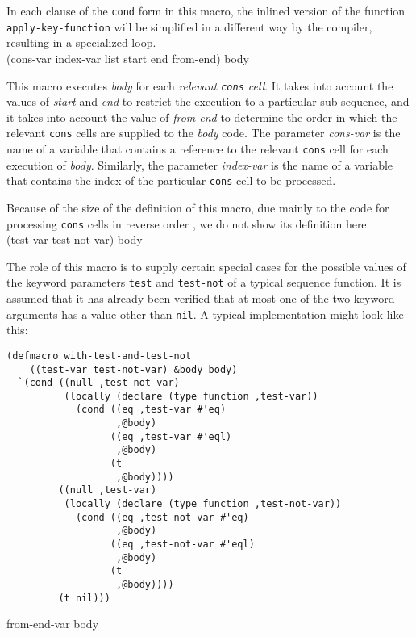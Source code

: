In each clause of the \texttt{cond} form in this macro, the inlined
version of the function \texttt{apply-key-function} will be simplified
in a different way by the compiler, resulting in a specialized loop.
\vskip 0.3cm\noindent
{}\\
{(cons-var index-var list start end from-end) \body body}

This macro executes \textit{body} for each \emph{relevant
  \texttt{cons} cell}.  It takes into account the values of
\textit{start} and \textit{end} to restrict the execution to a
particular sub-sequence, and it takes into account the value of
\textit{from-end} to determine the order in which the relevant
\texttt{cons} cells are supplied to the \textit{body} code.  The
parameter \textit{cons-var} is the name of a variable that contains a
reference to the relevant \texttt{cons} cell for each execution of
\textit{body}.  Similarly, the parameter \textit{index-var} is the
name of a variable that contains the index of the particular
\texttt{cons} cell to be processed.

Because of the size of the definition of this macro, due mainly to the
code for processing \texttt{cons} cells in reverse order
\cite{Durand:2015:ELS:reverse}, we do not show its definition here.
\vskip 0.3cm\noindent
{}\\
{(test-var test-not-var) \body body}

The role of this macro is to supply certain special cases for the
possible values of the keyword parameters \texttt{test} and
\texttt{test-not} of a typical sequence function.  It is assumed that
it has already been verified that at most one of the two keyword
arguments has a value other than \texttt{nil}.  A typical
implementation might look like this:

{\small\begin{verbatim}
(defmacro with-test-and-test-not
    ((test-var test-not-var) &body body)
  `(cond ((null ,test-not-var)
          (locally (declare (type function ,test-var))
            (cond ((eq ,test-var #'eq)
                   ,@body)
                  ((eq ,test-var #'eql)
                   ,@body)
                  (t
                   ,@body))))
         ((null ,test-var)
          (locally (declare (type function ,test-not-var))
            (cond ((eq ,test-not-var #'eq)
                   ,@body)
                  ((eq ,test-not-var #'eql)
                   ,@body)
                  (t
                   ,@body))))
         (t nil)))
\end{verbatim}}
\noindent
{} {from-end-var \body body}

